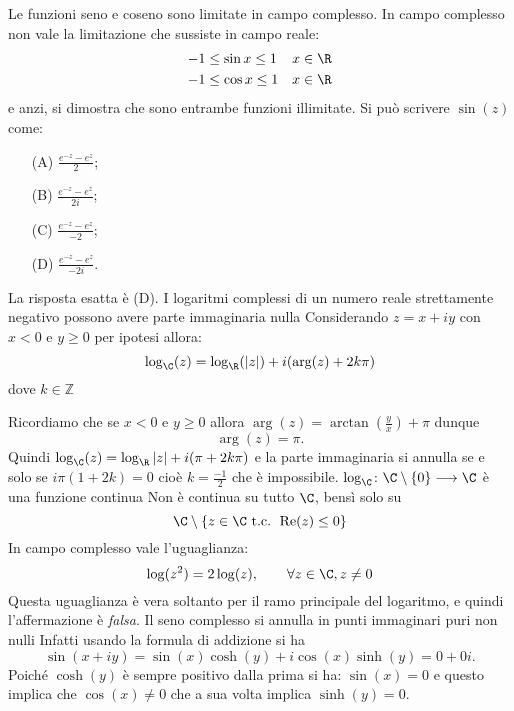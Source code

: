 Le funzioni seno e coseno sono limitate in campo complesso.
    In campo complesso non vale la limitazione che sussiste in campo reale: \begin{align*}
        -1 &\le \sin x \le  1 & x&\in \R \\
        -1 &\le \cos x \le 1 & x&\in \R 
    \end{align*}e anzi, si dimostra che sono entrambe funzioni illimitate.
Si può scrivere $\sin(z)$ come: \begin{itemize}
    \item[(A)] $\frac{e^{-z}-e^z}{2}$; 
    \item[(B)] $\frac{e^{-z}-e^z}{2i}$; 
    \item[(C)] $\frac{e^{-z}-e^z}{-2}$;
    \item[(D)] $\frac{e^{-z}-e^z}{-2i}$. 
\end{itemize}
    La risposta esatta è (D).
    I logaritmi complessi di un numero reale strettamente negativo possono avere parte immaginaria nulla
Considerando $z=x+iy$ con $x<0$ e $y\ge 0$ per ipotesi allora: 
\[\log_{\C}(z)=\log_{\R}(\left\vert z\right\vert)+i(\text{arg}(z)+2k\pi)\]dove $k\in\mathbb{Z}$

Ricordiamo che se $x<0$ e $y\ge 0$ allora  $\operatorname{arg}(z)=\operatorname{arctan}(\frac{y}{x})+\pi$ dunque 
\[\operatorname{arg}(z)=\pi.\]Quindi $\log_{\C}(z)=\log_{\R}\left\vert z\right\vert+i(\pi+2k\pi)$ e la parte immaginaria si annulla se e solo se  $i\pi(1+2k)=0$ cioè $k=\frac{-1}{2}$ che è impossibile.
$\log_{\C}\colon\C\setminus\{0\} \longrightarrow\C$ è una funzione continua
    Non è continua su tutto $ \C $, bensì solo su \[
        \C\setminus\{z\in\C \text{ t.c. } \operatorname{Re}(z) \le 0\}
    \]
In campo complesso vale l'uguaglianza: \[\log(z^2)=2\log(z) , \qquad  \forall z \in\C , z\neq0\]
    Questa uguaglianza è vera soltanto per il ramo principale del logaritmo, e quindi l'affermazione è \emph{falsa}.
    Il seno complesso si annulla in punti immaginari puri non nulli
Infatti usando la formula di addizione si ha 
\[\sin (x+iy)=\sin(x)\cosh(y)+i\cos(x)\sinh(y)= 0+0i.\]
Poiché $\cosh(y)$ è sempre positivo dalla prima si ha: $\sin(x)=0$ e questo implica che $\cos(x)\neq0$ che a sua volta implica $\sinh(y)=0$. 

